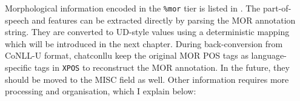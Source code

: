 
Morphological information encoded in the \texttt{\%mor} tier is listed in . The part-of-speech and features can be extracted directly by parsing the MOR annotation string. They are converted to UD-style values using a deterministic mapping which will be introduced in the next chapter.  During back-conversion from CoNLL-U format, chatconllu keep the original MOR POS tags as language-specific tags in \texttt{XPOS} to reconstruct the MOR annotation. In the future, they should be moved to the MISC field as well. Other information requires more processing and organisation, which I explain below:

